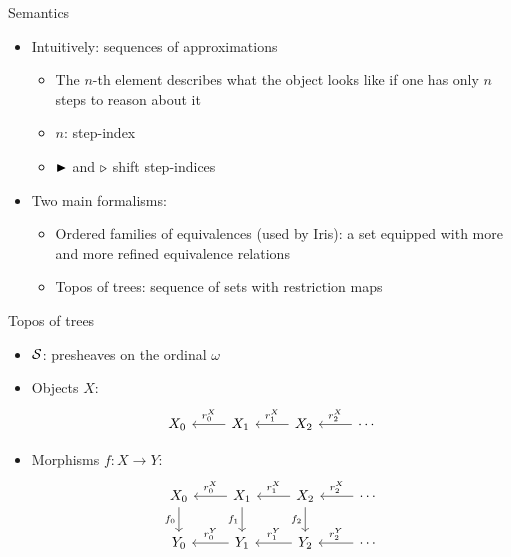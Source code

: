 \documentclass{beamer}
\begin{document}
\begin{frame}{Semantics}
\begin{itemize}
    \item Intuitively: sequences of approximations
    \begin{itemize}
         \item The $n$-th element describes what the object looks like if one has only $n$ steps to reason about it
        \item $n$: step-index
         \item $\blacktriangleright$ and $\triangleright$ shift step-indices
    \end{itemize}
    \item Two main formalisms:
    \begin{itemize}
        \item Ordered families of equivalences (used by Iris): a set equipped with more and more refined equivalence relations
        \item Topos of trees: sequence of sets with restriction maps
    \end{itemize}
\end{itemize}
\end{frame}

\begin{frame}[fragile]{Topos of trees}
\begin{itemize}
    \item $\mathcal{S}$: presheaves on the ordinal $\omega$
    \item Objects $X$:
    \[\begin{tikzcd}
    	{X_0} & {X_1} & {X_2} & \cdots
    	\arrow["{r^X_0}"', from=1-2, to=1-1]
    	\arrow["{r^X_1}"', from=1-3, to=1-2]
    	\arrow["{r^X_2}"', from=1-4, to=1-3]
    \end{tikzcd}\]
    \item Morphisms $f : X \to Y$:
    \[\begin{tikzcd}
    	{X_0} & {X_1} & {X_2} & \cdots \\
    	{Y_0} & {Y_1} & {Y_2} & \cdots
    	\arrow["{r^X_0}"', from=1-2, to=1-1]
    	\arrow["{r^X_1}"', from=1-3, to=1-2]
    	\arrow["{r^X_2}"', from=1-4, to=1-3]
    	\arrow["{r^Y_0}"', from=2-2, to=2-1]
    	\arrow["{r^Y_1}"', from=2-3, to=2-2]
    	\arrow["{r^Y_2}"', from=2-4, to=2-3]
    	\arrow["{f_0}"', from=1-1, to=2-1]
    	\arrow["{f_1}"', from=1-2, to=2-2]
    	\arrow["{f_2}"', from=1-3, to=2-3]
    \end{tikzcd}\]
\end{itemize}
\end{frame}
\end{document}

